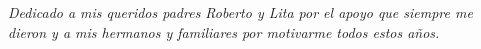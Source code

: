 
{\it Dedicado a mis queridos padres Roberto y Lita por el apoyo que siempre me
dieron y a mis hermanos y familiares por motivarme todos estos a\~nos.}
